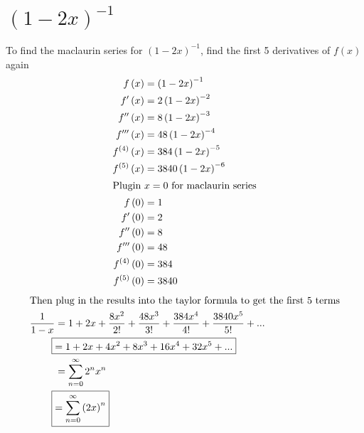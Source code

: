 \documentclass[12pt]{article}
\begin{document}
\section{\texorpdfstring{$\left(1-2x\right)^{-1}$}{Lg}}
To find the maclaurin series for $\left(1-2x\right)^{-1}$, find the first 5 derivatives of $f(x)$ again
\begin{align}
  f\left(x\right)                  & =\left(1-2x\right)^{-1}                                                                 \\
  f'\left(x\right)                 & =2\left(1-2x\right)^{-2}                                                                \\
  f''\left(x\right)                & =8\left(1-2x\right)^{-3}                                                                \\
  f'''\left(x\right)               & =48\left(1-2x\right)^{-4}                                                               \\
  f^{\left(4\right)}\left(x\right) & =384\left(1-2x\right)^{-5}                                                              \\
  f^{\left(5\right)}\left(x\right) & =3840\left(1-2x\right)^{-6}                                                             \\
  \intertext{Plugin $x=0$ for maclaurin series}
  f\left(0\right)                  & =1                                                                                      \\
  f'\left(0\right)                 & =2                                                                                      \\
  f''\left(0\right)                & =8                                                                                      \\
  f'''\left(0\right)               & =48                                                                                     \\
  f^{\left(4\right)}\left(0\right) & =384                                                                                    \\
  f^{\left(5\right)}\left(0\right) & =3840                                                                                   
\end{align}
\begin{align}
  \intertext{Then plug in the results into the taylor formula to get the first 5 terms}
  \frac{1}{1-x}                    & =1+2x+\frac{8x^{2}}{2!}+\frac{48x^{3}}{3!}+\frac{384x^{4}}{4!}+\frac{3840x^{5}}{5!}+... \\
                                   \Aboxed{& =1+2x+4x^{2}+8x^{3}+16x^{4}+32x^{5}+...}                                                 \\
                                   & = \sum_{n=0}^{\infty}2^{n}x^{n}                                                         \\
                                   \Aboxed{& = \sum_{n=0}^{\infty}\left(2x\right)^{n}}                                                
\end{align}
\end{document}
